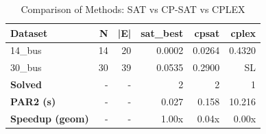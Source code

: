 \begin{table}[htbp]
\centering
\caption{Comparison of Methods: SAT vs CP-SAT vs CPLEX}
\label{tab:table_methods}
\begin{tabular}{lrrrrr}
\toprule
Dataset & N & |E| & sat\_best & cpsat & cplex \\
\midrule
14\_bus & 14 & 20 & 0.0002 & 0.0264 & 0.4320 \\
30\_bus & 30 & 39 & 0.0535 & 0.2900 & SL \\
\midrule
\textbf{Solved} & - & - & 2 & 2 & 1 \\
\textbf{PAR2 (s)} & - & - & 0.027 & 0.158 & 10.216 \\
\textbf{Speedup (geom)} & - & - & 1.00x & 0.04x & 0.00x \\
\bottomrule
\end{tabular}
\end{table}
